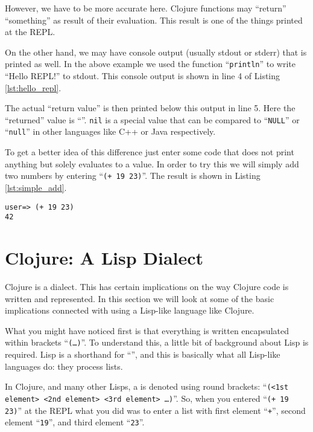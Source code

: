 However, we have to be more accurate here.
Clojure functions may ``return'' ``something'' as result of their evaluation.
This result is one of the things printed at the REPL.

On the other hand, we may have console output (usually stdout or stderr) that is printed as well.
In the above example we used the function ``\texttt{println}'' to write ``Hello REPL!'' to stdout.
This console output is shown in line 4 of Listing \vref{lst:hello_repl}.

The actual ``return value'' is then printed below this output in line 5.
Here the ``returned'' value is ``''.
\texttt{nil} is a special value that can be compared to ``\texttt{NULL}'' or ``\texttt{null}'' in other languages like C++ or Java respectively.

To get a better idea of this difference just enter some code that does not print anything but solely evaluates to a value.
In order to try this we will simply add two numbers by entering ``\texttt{(+ 19 23)}''.
The result is shown in Listing \vref{lst:simple_add}.

\begin{lstlisting}[label=lst:simple_add, caption=Simple Addition in the REPL]
user=> (+ 19 23)
42
\end{lstlisting}

\section{Clojure: A Lisp Dialect}
Clojure is a  dialect.
This has certain implications on the way Clojure code is written and represented.
In this section we will look at some of the basic implications connected with using a Lisp-like language like Clojure.

What you might have noticed first is that everything is written encapsulated within brackets ``\texttt{(\ldots)}''.
To understand this, a little bit of background about Lisp is required.
Lisp is a shorthand for ``'', and this is basically what all Lisp-like languages do: they process lists.

In Clojure, and many other Lisps, a  is denoted using round brackets: ``\texttt{(<1st element> <2nd element> <3rd element> \ldots)}''.
So, when you entered ``\texttt{(+ 19 23)}'' at the REPL what you did was to enter a list with first element ``\texttt{+}'', second element ``\texttt{19}'', and third element ``\texttt{23}''.


